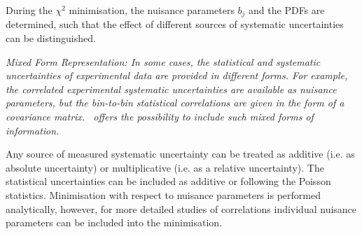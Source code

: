 \begin{description}
During the $\chi^2$ minimisation, the nuisance parameters $b_j$ and the PDFs are determined, such that the effect of different sources of systematic uncertainties can be distinguished.
\item  \it{Mixed Form Representation:} \rm
In some cases, the statistical and systematic uncertainties of experimental data are provided in different forms.    
For example, the correlated experimental systematic uncertainties are available as nuisance parameters,
but the bin-to-bin statistical correlations are given in the form of a covariance matrix.
\fitter\ offers the possibility to include such mixed forms of information. 
\end{description}
Any source of measured systematic uncertainty can be treated as additive (i.e. as absolute uncertainty) or multiplicative (i.e. as a relative uncertainty). 
The statistical uncertainties can be included as additive or following the Poisson statistics. Minimisation
with respect to nuisance parameters is performed analytically, however, for more 
detailed studies of correlations individual nuisance parameters can be included into 
the \minuit minimisation.


